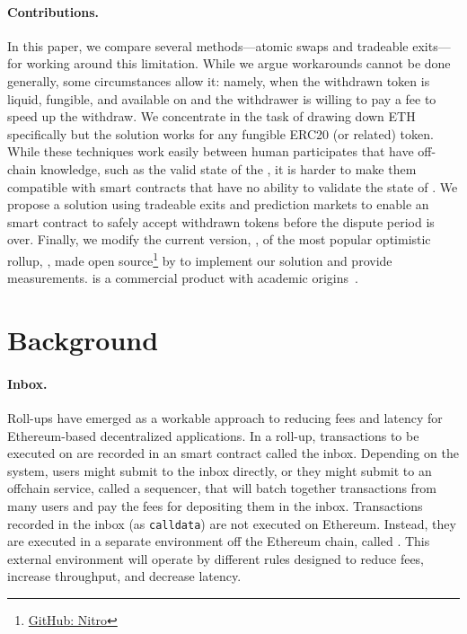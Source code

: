 \paragraph{Contributions.} In this paper, we compare several methods---atomic swaps and tradeable exits---for working around this limitation. While we argue workarounds cannot be done generally, some circumstances allow it: namely, when the withdrawn token is liquid, fungible, and available on \layerone and the withdrawer is willing to pay a fee to speed up the withdraw. We concentrate in the task of drawing down ETH specifically but the solution works for any fungible ERC20 (or related) token. While these techniques work easily between human participates that have off-chain knowledge, such as the valid state of the \layertwo, it is harder to make them compatible with \layerone smart contracts that have no ability to validate the state of \layertwo. We propose a solution using tradeable exits and prediction markets to enable an \layerone smart contract to safely accept withdrawn tokens before the dispute period is over. Finally, we modify the current version, \nitro, of the most popular optimistic rollup, \arb, made open source\footnote{\href{https://}{GitHub: Nitro}} by \offchain to implement our solution and provide measurements. \arb is a commercial product with academic origins~\cite{kalodner2018arbitrum}.
 

\section{Background} 

\paragraph{Inbox.} Roll-ups have emerged as a workable approach to reducing fees and latency for Ethereum-based decentralized applications. In a roll-up,  transactions to be executed on \layertwo are recorded in an \layerone smart contract called the inbox. Depending on the system, users might submit to the inbox directly, or they might submit to an offchain service, called a sequencer, that will batch together transactions from many users and pay the \layerone fees for depositing them in the inbox. Transactions recorded in the inbox (as \texttt{calldata}) are not executed on Ethereum. Instead, they are executed in a separate environment off the Ethereum chain, called \layertwo. This external environment will operate by different rules designed to reduce fees, increase throughput, and decrease latency. 

